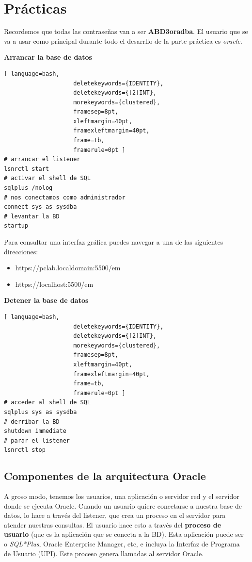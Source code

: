 \chapter{Prácticas}

Recordemos que todas las contraseñas van a ser \textbf{ABD3oradba}. El usuario que se va a usar como principal durante todo el desarrllo de la parte práctica es \textit{oracle}.

\textbf{Arrancar la base de datos}

\begin{lstlisting}[ language=bash,
                    deletekeywords={IDENTITY},
                    deletekeywords={[2]INT},
                    morekeywords={clustered},
                    framesep=8pt,
                    xleftmargin=40pt,
                    framexleftmargin=40pt,
                    frame=tb,
                    framerule=0pt ]
# arrancar el listener
lsnrctl start
# activar el shell de SQL
sqlplus /nolog
# nos conectamos como administrador
connect sys as sysdba
# levantar la BD
startup
\end{lstlisting}

Para consultar una interfaz gráfica puedes navegar a una de las siguientes direcciones:

\begin{itemize}
\item https://pclab.localdomain:5500/em
\item https://localhost:5500/em
\end{itemize}

\textbf{Detener la base de datos}

\begin{lstlisting}[ language=bash,
                    deletekeywords={IDENTITY},
                    deletekeywords={[2]INT},
                    morekeywords={clustered},
                    framesep=8pt,
                    xleftmargin=40pt,
                    framexleftmargin=40pt,
                    frame=tb,
                    framerule=0pt ]
# acceder al shell de SQL
sqlplus sys as sysdba
# derribar la BD
shutdown immediate
# parar el listener
lsnrctl stop
\end{lstlisting}

\section{Componentes de la arquitectura Oracle}

A groso modo, tenemos los usuarios, una aplicación o servidor red y el servidor donde se ejecuta Oracle. Cuando un usuario quiere conectarse a nuestra base de datos, lo hace a través del listener, que crea un proceso en el servidor para atender nuestras consultas. El usuario hace esto a través del \textbf{proceso de usuario} (que es la aplicación que se conecta a la BD). Esta aplicación puede ser o \textit{SQL*Plus}, Oracle Enterprise Manager, etc, e incluya la Interfaz de Programa de Usuario (UPI). Este proceso genera llamadas al servidor Oracle.

